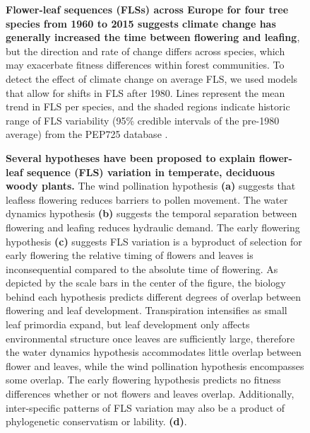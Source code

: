 \documentclass[11pt]{article}
\begin{document}
  
  \begin{figure}[h!]
  \centering
  \caption{\textbf{Flower-leaf sequences (FLSs) across Europe for four tree species from 1960 to 2015 suggests climate change has generally increased the time between flowering and leafing}, but the direction and rate of change differs across species, which may exacerbate fitness differences within forest communities. To detect the effect of climate change on average FLS, we used models that allow for shifts in FLS after 1980. Lines represent the mean trend in FLS per species, and the shaded regions indicate historic range of FLS variability (95\% credible intervals of the pre-1980 average) from the PEP725 database \citep{PEP725}.}
  \label{fig:climchange}
  \end{figure}
  
  \begin{figure}[h!]
  \centering
  \caption{\textbf{Several hypotheses have been proposed to explain flower-leaf sequence (FLS) variation in temperate, deciduous woody plants.}  The wind pollination hypothesis \textbf{(a)} suggests that leafless flowering reduces barriers to pollen movement. The water dynamics hypothesis \textbf{(b)} suggests the temporal separation between flowering and leafing reduces hydraulic demand. The early flowering hypothesis \textbf{(c)} suggests FLS variation is a byproduct of selection for early flowering the relative timing of flowers and leaves is inconsequential compared to the absolute time of flowering. As depicted by the scale bars in the center of the figure, the biology behind each hypothesis predicts different degrees of overlap between flowering and leaf development. Transpiration intensifies as small leaf primordia expand, but leaf development only affects environmental structure once leaves are sufficiently large, therefore the water dynamics hypothesis accommodates little overlap between flower and leaves, while the wind pollination hypothesis encompasses some overlap. The early flowering hypothesis predicts no fitness differences whether or not flowers and leaves overlap. Additionally, inter-specific patterns of FLS variation may also be a product of phylogenetic conservatism or lability. \textbf{(d)}.}
  \label{fig:conceptual}
  \end{figure}
  
\end{document}
